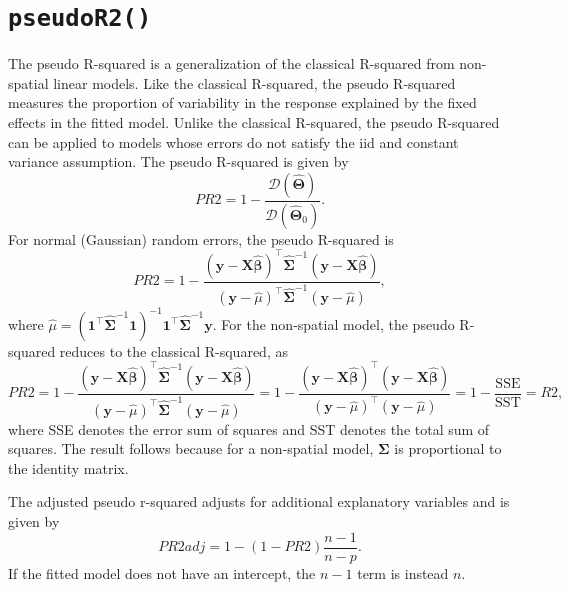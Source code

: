 \documentclass[10pt,letterpaper]{article}
\begin{document}
\hypertarget{sec:pr2}{%
\section{\texorpdfstring{\texttt{pseudoR2()}}{pseudoR2()}}\label{sec:pr2}}

The pseudo R-squared is a generalization of the classical R-squared from
non-spatial linear models. Like the classical R-squared, the pseudo
R-squared measures the proportion of variability in the response
explained by the fixed effects in the fitted model. Unlike the classical
R-squared, the pseudo R-squared can be applied to models whose errors do
not satisfy the iid and constant variance assumption. The pseudo
R-squared is given by \begin{equation*}
PR2 = 1 - \frac{\mathcal{D}(\boldsymbol{\hat{\Theta}})}{\mathcal{D}(\boldsymbol{\hat{\Theta}}_0)}.
\end{equation*} For normal (Gaussian) random errors, the pseudo
R-squared is \begin{equation*}
PR2 = 1 - \frac{(\mathbf{y} - \mathbf{X} \hat{\boldsymbol{\beta}})^\top \hat{\boldsymbol{\Sigma}}^{-1}(\mathbf{y} - \mathbf{X} \hat{\boldsymbol{\beta}})}{(\mathbf{y} - \hat{\mu})^\top \hat{\boldsymbol{\Sigma}}^{-1}(\mathbf{y} - \hat{\mu})},
\end{equation*} where
\(\hat{\mu} = (\boldsymbol{1}^\top \hat{\boldsymbol{\Sigma}}^{-1} \boldsymbol{1})^{-1} \boldsymbol{1}^\top \hat{\boldsymbol{\Sigma}}^{-1} \mathbf{y}\).
For the non-spatial model, the pseudo R-squared reduces to the classical
R-squared, as \begin{equation*}
PR2 = 1 - \frac{(\mathbf{y} - \mathbf{X} \hat{\boldsymbol{\beta}})^\top \hat{\boldsymbol{\Sigma}}^{-1}(\mathbf{y} - \mathbf{X} \hat{\boldsymbol{\beta}})}{(\mathbf{y} - \hat{\mu})^\top \hat{\boldsymbol{\Sigma}}^{-1}(\mathbf{y} - \hat{\mu})}  = 1 - \frac{(\mathbf{y} - \mathbf{X} \hat{\boldsymbol{\beta}})^\top (\mathbf{y} - \mathbf{X} \hat{\boldsymbol{\beta}})}{(\mathbf{y} - \hat{\mu})^\top (\mathbf{y} - \hat{\mu})} = 1 - \frac{\text{SSE}}{\text{SST}} = R2,
\end{equation*} where SSE denotes the error sum of squares and SST
denotes the total sum of squares. The result follows because for a
non-spatial model, \(\boldsymbol{\Sigma}\) is proportional to the
identity matrix.

The adjusted pseudo r-squared adjusts for additional explanatory
variables and is given by \begin{equation*}
  PR2adj = 1 - (1 - PR2)\frac{n - 1}{n - p}.
\end{equation*} If the fitted model does not have an intercept, the
\(n - 1\) term is instead \(n\).
\end{document}
